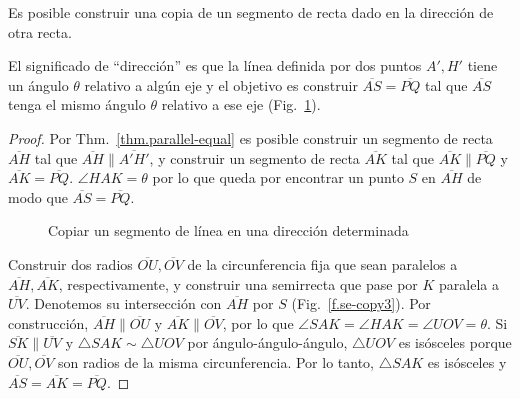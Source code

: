 {\begin{theorem}\label{thm.straight-direction}
Es posible construir una copia de un segmento de recta dado en la dirección de otra recta.
\end{theorem}

El significado de ``dirección'' es que la línea definida por dos puntos $A',H'$ tiene un ángulo $\theta$ relativo a algún eje y el objetivo es construir $\overline{AS}=\overline{PQ}$ tal que $\overline{AS}$ tenga el mismo ángulo $\theta$ relativo a ese eje (Fig.~\ref{f.se-copy1}).

\begin{proof}
Por Thm.~\ref{thm.parallel-equal} es posible construir un segmento de recta $\overline{AH}$ tal que $\overline{AH}\parallel\overline{A'H'}$, y construir un segmento de recta $\overline{AK}$ tal que $\overline{AK}\parallel\overline{PQ}$ y $\overline{AK}=\overline{PQ}$.
$\angle HAK=\theta$ por lo que queda por encontrar un punto $S$ en $\overline{AH}$ de modo que $\overline{AS}=\overline{PQ}$.

\begin{figure}[t]
\begin{center}
\end{center}
\caption{Copiar un segmento de línea en una dirección determinada}\label{f.se-copy1}
\end{figure}

Construir dos radios $\overline{OU}, \overline{OV}$ de la circunferencia fija que sean paralelos a $\overline{AH}, \overline{AK}$, respectivamente, y construir una semirrecta que pase por $K$ paralela a $\overline{UV}$. Denotemos su intersección con $\overline{AH}$ por $S$ (Fig.~\ref{f.se-copy3}). Por construcción, $\overline{AH}\parallel\overline{OU}$ y $\overline{AK}\parallel\overline{OV}$, por lo que $\angle SAK=\angle HAK=\angle UOV=\theta$. Si $\overline{SK}\parallel\overline{UV}$ y $\triangle SAK\sim\triangle UOV$ por ángulo-ángulo-ángulo, $\triangle UOV$ es isósceles porque $\overline{OU}, \overline{OV}$ son radios de la misma circunferencia. Por lo tanto, $\triangle SAK$ es isósceles y $\overline{AS}=\overline{AK}=\overline{PQ}$.
\end{proof}

}
